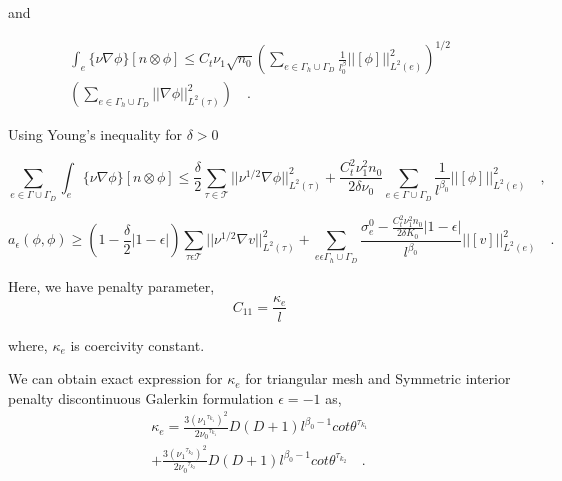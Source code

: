 \documentclass[a4paper,openany]{book}
\begin{document}
and

\begin{equation}
\begin{split}
\int_e \lbrace \nu \nabla \phi \rbrace[n \otimes \phi] \leq C_t \nu_1 \sqrt{n_0} \left( \sum_{e \in \Gamma_h \cup \Gamma_D} \frac{1}{l^\beta_0} ||[\phi]||^2_{L^2(e)} \right)^{1/2} \\ \left( \sum_{e \in \Gamma_h \cup \Gamma_D} ||\nabla \phi||^2_{L^2(\tau)} \right) \quad \textrm{.}
\end{split}
\end{equation}

Using Young's inequality for $\delta > 0$

\begin{equation}
\sum_{e \in \Gamma \cup \Gamma_D} \int_e \lbrace \nu \nabla \phi \rbrace [n \otimes \phi] \leq \frac{\delta}{2} \sum_{\tau \in \mathcal{T}} ||\nu^{1/2} \nabla \phi ||^2_{L^2(\tau)} +  \frac{C_t^2 \nu_1^2 n_0}{2 \delta \nu_0}  \sum_{e \in \Gamma \cup \Gamma_D} \frac{1}{l^{\beta_0}} ||[\phi]||^2_{L^2(e)} \quad \textrm{,}
\end{equation}

\begin{equation}
a_\epsilon (\phi , \phi) \geq \left( 1-\frac{\delta}{2} |1-\epsilon| \right) \sum_{\tau \epsilon \mathcal{T}} ||\nu^{1/2} \nabla v ||^2_{L^2(\tau)} + \sum_{e \epsilon \Gamma_h \cup \Gamma_D} \frac{\sigma_e^0 - \frac{C_t^2 \nu_1^2 n_0}{2 \delta K_0}|1-\epsilon|}{l^{\beta_0}} ||[v]||^2_{L^2(e)} \quad \textrm{.}
\end{equation}

Here, we have penalty parameter,
\begin{equation}
C_{11} = \frac{\kappa_e}{l}
\end{equation} 

where, $\kappa_e$ is coercivity constant.

We can obtain exact expression for $\kappa_e$ for triangular mesh and Symmetric interior penalty discontinuous Galerkin formulation $\epsilon = -1$ as,\\
\begin{equation}
\begin{split}
\kappa_e = \frac{3 ( {\nu_1}^{\tau_{k_1}})^2}{2 {\nu_0}^{\tau_{k_1}}} D (D+1) l^{\beta_0 - 1} cot {\theta^{\tau_{k_1}}}  \\ + \frac{3 ( {\nu_1}^{\tau_{k_2}})^2}{2 {\nu_0}^{\tau_{k_2}}} D (D+1) l^{\beta_0 - 1} cot {\theta^{\tau_{k_2}}} \quad \textrm{.}
\end{split}
\end{equation} 
\end{document}
